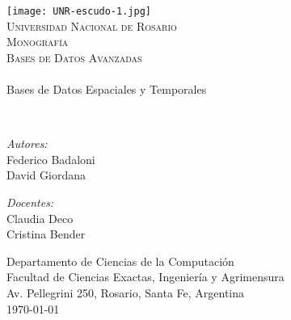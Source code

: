 {%
\thispagestyle{empty}
\begin{center}
    \texttt{[image: UNR-escudo-1.jpg]}
    \\[0.5cm]
    \textsc{\LARGE Universidad Nacional de Rosario}\\[1.5cm]

    \textsc{{\Large Monografía} \\ Bases de Datos Avanzadas}\\[0.5cm]
    \HRule \\[0.4cm] %
        {\huge Bases de Datos Espaciales y Temporales \\[0.4cm]}

    \HRule \\[0.4cm] %
    \noindent
    \begin{minipage}{0.4\textwidth}
        \begin{flushleft} \large
            \emph{Autores:}\\
            Federico Badaloni \\
            David Giordana
        \end{flushleft}
        \end{minipage}%
        \begin{minipage}{0.4\textwidth}
        \begin{flushright} \large
            \emph{Docentes:} \\
            Claudia Deco \\
            Cristina Bender
        \end{flushright}
    \end{minipage}

\vfill

Departamento de Ciencias de la Computaci\'on\\
Facultad de Ciencias Exactas, Ingenier\'ia y Agrimensura\\
Av. Pellegrini 250, Rosario, Santa Fe, Argentina\\[0.4cm]
{\large \today}

\end{center}
\clearpage
}